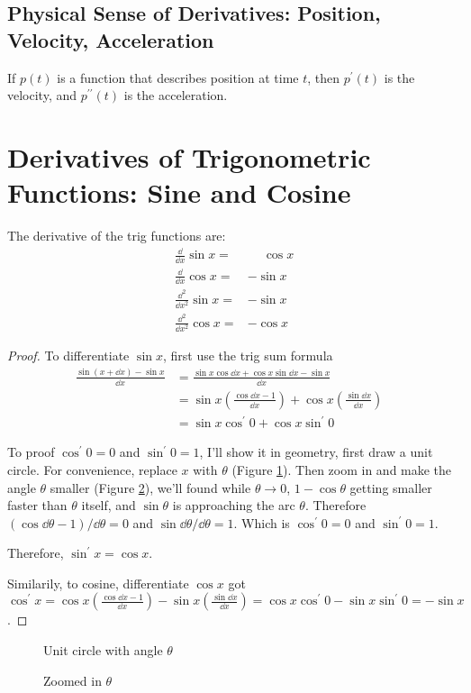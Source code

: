 \subsection{Physical Sense of Derivatives: Position, Velocity, Acceleration}
If $p(t)$ is a function that describes position at time $t$, then $p^\prime(t)$ is the velocity, and $p^{\prime\prime}(t)$ is the acceleration.

\section{Derivatives of Trigonometric Functions: Sine and Cosine}
The derivative of the trig functions are:
\begin{align*}
  \frac\dd{\dd x}\sin x=       & \mathbin{\phantom-}\cos x\\
  \frac\dd{\dd x}\cos x=       & -\sin x\\
  \frac{\dd^2}{\dd x^2}\sin x= & -\sin x\\
  \frac{\dd^2}{\dd x^2}\cos x= & -\cos x
\end{align*}
\begin{proof}
To differentiate $\sin x$, first use the trig sum formula
\begin{align*}
  \frac{\sin(x+\dd x)-\sin x}{\dd x} & =\frac{\sin x\cos\dd x+\cos x\sin\dd x-\sin x}{\dd x} & \\
  & =\sin x\left(\frac{\cos\dd x-1}{\dd x}\right)+\cos x\left(\frac{\sin\dd x}{\dd x}\right)\\
  & =\sin x\cos^\prime0+\cos x\sin^\prime0
\end{align*}

To proof $\cos^\prime0=0$ and $\sin^\prime0=1$, I'll show it in geometry, first draw a unit circle. For convenience, replace $x$ with $\theta$ (Figure \ref{fig:1}). Then zoom in and make the angle $\theta$ smaller (Figure \ref{fig:2}), we'll found while $\theta\to0$, $1-\cos\theta$ getting smaller faster than $\theta$ itself, and \(\sin\theta\) is approaching the arc $\theta$. Therefore $(\cos\dd\theta-1)/\dd\theta=0$ and $\sin\dd\theta/\dd\theta=1$. Which is $\cos^\prime0=0$ and $\sin^\prime0=1$.

Therefore, $\sin^\prime x=\cos x$.

Similarily, to cosine, differentiate $\cos x$ got $\cos^\prime x=\cos x\left(\frac{\cos\dd x-1}{\dd x}\right)-\sin x\left(\frac{\sin\dd x}{\dd x}\right)=\cos x\cos^\prime 0-\sin x\sin^\prime 0=-\sin x$.
\end{proof}
\begin{figure}[H]
  \centering
  \caption{Unit circle with angle $\theta$}
  \label{fig:1}
\end{figure}
\begin{figure}[H]
  \centering
  \caption{Zoomed in $\theta$}
  \label{fig:2}
\end{figure}

